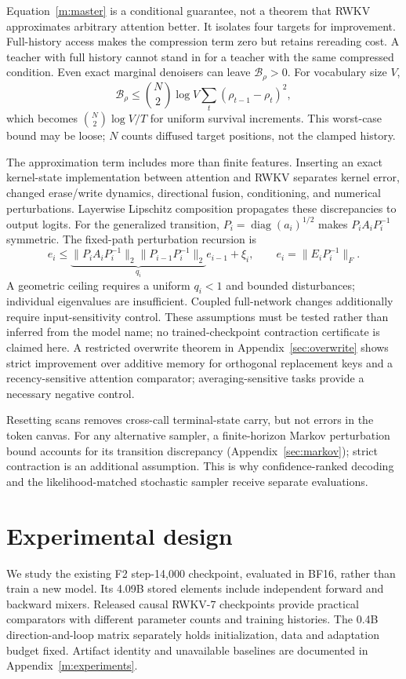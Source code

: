 \documentclass{article}
\theoremstyle{remark}\newtheorem{remark}[theorem]{Remark}
\newcommand{\diag}{\operatorname{diag}}
\begin{document}
Equation~\eqref{m:master} is a conditional guarantee, not a theorem that RWKV approximates arbitrary attention better. It isolates four targets for improvement. Full-history access makes the compression term zero but retains rereading cost. A teacher with full history cannot stand in for a teacher with the same compressed condition. Even exact marginal denoisers can leave $\mathcal B_\rho>0$. For vocabulary size $V$,
\begin{equation}
\mathcal B_\rho\le\binom N2\log V\sum_t(\rho_{t-1}-\rho_t)^2,
\label{m:mesh}
\end{equation}
which becomes $\binom N2\log V/T$ for uniform survival increments. This worst-case bound may be loose; $N$ counts diffused target positions, not the clamped history.

The approximation term includes more than finite features. Inserting an exact kernel-state implementation between attention and RWKV separates kernel error, changed erase/write dynamics, directional fusion, conditioning, and numerical perturbations. Layerwise Lipschitz composition propagates these discrepancies to output logits. For the generalized transition, $P_i=\diag(a_i)^{1/2}$ makes $P_iA_iP_i^{-1}$ symmetric. The fixed-path perturbation recursion is
\begin{equation}
 e_i\le \underbrace{\|P_iA_iP_i^{-1}\|_2\|P_{i-1}P_i^{-1}\|_2}_{q_i}e_{i-1}+\xi_i,
 \qquad e_i=\|E_iP_i^{-1}\|_F.
\label{m:statebound}
\end{equation}
A geometric ceiling requires a uniform $q_i<1$ and bounded disturbances; individual eigenvalues are insufficient. Coupled full-network changes additionally require input-sensitivity control. These assumptions must be tested rather than inferred from the model name; no trained-checkpoint contraction certificate is claimed here. A restricted overwrite theorem in Appendix~\ref{sec:overwrite} shows strict improvement over additive memory for orthogonal replacement keys and a recency-sensitive attention comparator; averaging-sensitive tasks provide a necessary negative control.

Resetting scans removes cross-call terminal-state carry, but not errors in the token canvas. For any alternative sampler, a finite-horizon Markov perturbation bound accounts for its transition discrepancy (Appendix~\ref{sec:markov}); strict contraction is an additional assumption. This is why confidence-ranked decoding and the likelihood-matched stochastic sampler receive separate evaluations.

\section{Experimental design}
\label{m:design-summary}
We study the existing F2 step-14,000 checkpoint, evaluated in BF16, rather than train a new model. Its 4.09B stored elements include independent forward and backward mixers. Released causal RWKV-7 checkpoints provide practical comparators with different parameter counts and training histories. The 0.4B direction-and-loop matrix separately holds initialization, data and adaptation budget fixed. Artifact identity and unavailable baselines are documented in Appendix~\ref{m:experiments}.
\end{document}
